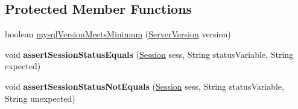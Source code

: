 \subsection*{Protected Member Functions}
\begin{DoxyCompactItemize}
\item 
boolean \mbox{\hyperlink{classtestsuite_1_1x_1_1internal_1_1_internal_x_base_test_case_aef44a0618434c52b5a52a5676bbf73c0}{mysql\+Version\+Meets\+Minimum}} (\mbox{\hyperlink{classcom_1_1mysql_1_1cj_1_1_server_version}{Server\+Version}} version)
\item 
\mbox{\label{classtestsuite_1_1x_1_1internal_1_1_internal_x_base_test_case_a2d18783f0ca99200dc1415790f8e50f7}} 
void {\bfseries assert\+Session\+Status\+Equals} (\mbox{\hyperlink{interfacecom_1_1mysql_1_1cj_1_1xdevapi_1_1_session}{Session}} sess, String status\+Variable, String expected)
\item 
\mbox{\label{classtestsuite_1_1x_1_1internal_1_1_internal_x_base_test_case_a2414b3472ecb564edb0f0985be4d7eac}} 
void {\bfseries assert\+Session\+Status\+Not\+Equals} (\mbox{\hyperlink{interfacecom_1_1mysql_1_1cj_1_1xdevapi_1_1_session}{Session}} sess, String status\+Variable, String unexpected)
\end{DoxyCompactItemize}
